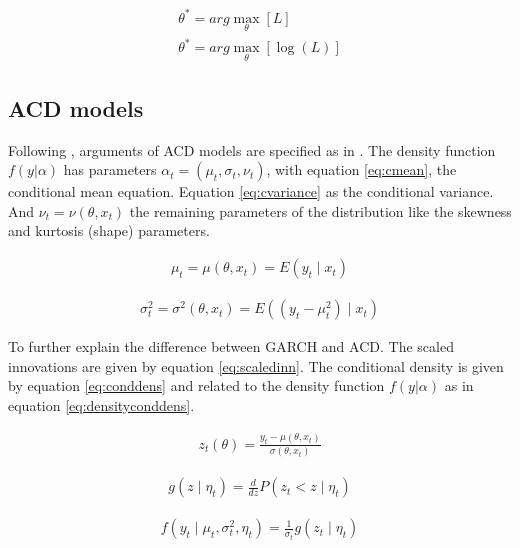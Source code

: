 \documentclass[a4paper, twoside]{templates/ociamthesis}
\begin{document}
\begin{align} 
\theta^{*} = arg \max_{\theta} [ L] \\
\theta^{*} = arg \max_{\theta} [\log(L)]
 \label{eq:optim}
\end{align}

\hypertarget{acd-models-meth}{%
\subsection{ACD models}\label{acd-models-meth}}

Following \textcite{ghalanos2016}, arguments of ACD models are specified as in \textcite{hansen1994}. The density function \(f(y|\alpha)\) has parameters \(\alpha_t = (\mu_t, \sigma_t, \nu_t)\), with equation \eqref{eq:cmean}, the conditional mean equation. Equation \eqref{eq:cvariance} as the conditional variance. And \(\nu_t=\nu(\theta,x_t)\) the remaining parameters of the distribution like the skewness and kurtosis (shape) parameters.

\begin{align} 
\mu_{t}=\mu\left(\theta, x_{t}\right)=E\left(y_{t} \mid x_{t}\right)
 \label{eq:cmean}
\end{align}

\begin{align}
\sigma_{t}^{2}=\sigma^{2}\left(\theta, x_{t}\right)=E\left(\left(y_{t}-\mu_{t}^{2}\right) \mid x_{t}\right)
 \label{eq:cvariance}
\end{align}

To further explain the difference between GARCH and ACD. The scaled innovations are given by equation \eqref{eq:scaledinn}. The conditional density is given by equation \eqref{eq:conddens} and related to the density function \(f(y|\alpha)\) as in equation \eqref{eq:densityconddens}.

\begin{align}
z_{t}(\theta)=\frac{y_{t}-\mu\left(\theta, x_{t}\right)}{\sigma\left(\theta, x_{t}\right)}
\label{eq:scaledinn}
\end{align}

\begin{align}
g\left(z \mid \eta_{t}\right)=\frac{d}{d z} P\left(z_{t}<z \mid \eta_{t}\right)
\label{eq:conddens}
\end{align}

\begin{align}
f\left(y_{t} \mid \mu_{t}, \sigma_{t}^{2}, \eta_{t}\right)=\frac{1}{\sigma_{t}} g\left(z_{t} \mid \eta_{t}\right)
\end{align}
\label{eq:densityconddens}
\end{document}

